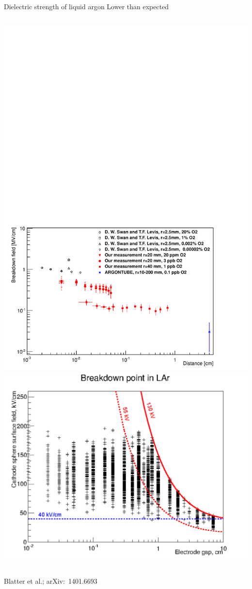 \documentclass[]{beamer}
\newcommand*{\emphcoltitle}{blue}
\begin{document}
\begin{frame}{Dielectric strength of liquid argon}{\color{\emphcoltitle} Lower than expected}
	\begin{columns}[c]
		\centering
		\includegraphics[viewport=18 10 511 351, clip, width=\textwidth]{defence/breakdown_plot}
		\centering
		\includegraphics[width=\textwidth]{defence/breakdown_summary}
	\end{columns}
	\centering
	{\tiny Blatter et al.; arXiv:~1401.6693~\cite{breakdown_14}}
\end{frame}
\end{document}
